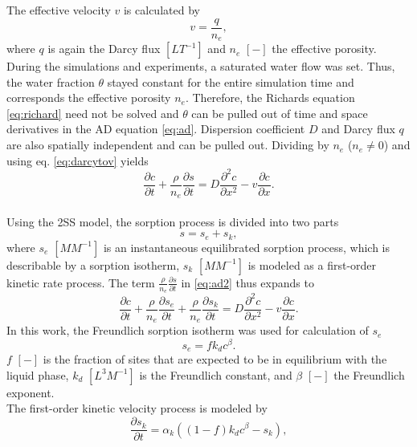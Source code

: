 The effective velocity $v$ is calculated by
\begin{equation}
    v = \frac{q}{n_e},
    \label{eq:darcytov}
\end{equation}
where $q$ is again the Darcy flux $[LT^{-1}]$ and $n_e$ $[-]$ the effective porosity.\\
During the simulations and experiments, a saturated water flow was set. Thus, the water fraction $\theta$ stayed constant for the entire simulation time and corresponds the effective porosity $n_e$. Therefore, the Richards equation \ref{eq:richard} need not be solved and $\theta$ can be pulled out of time and space derivatives in the AD equation \ref{eq:ad}. Dispersion coefficient $D$ and Darcy flux $q$ are also spatially independent and can be pulled out. Dividing by $n_e$ ($n_e \neq 0$) and using eq. \ref{eq:darcytov} yields
\begin{equation}
    \frac{\partial c}{\partial t} + \frac{\rho}{n_e} \frac{\partial s}{\partial t} = D \frac{\partial^2 c}{\partial x^2} - v\frac{\partial c}{\partial x}.
    \label{eq:ad2}
\end{equation}
\\
Using the 2SS model, the sorption process is divided into two parts
\begin{equation}
    s = s_e + s_k,
\end{equation}
where $s_e$ $[M M^{-1}]$ is an instantaneous equilibrated sorption process, which is describable by a sorption isotherm, $s_k$ $[M M^{-1}]$ is modeled as a first-order kinetic rate process. The term $\frac{\rho}{n_e} \frac{\partial s}{\partial t}$ in \ref{eq:ad2} thus expands to
\begin{equation}
        \frac{\partial c}{\partial t} + \frac{\rho}{n_e} \frac{\partial s_e}{\partial t} + \frac{\rho}{n_e} \frac{\partial s_k}{\partial t} = D \frac{\partial^2 c}{\partial x^2} - v\frac{\partial c}{\partial x}.
    \label{eq:ad2ss}
\end{equation}
In this work, the Freundlich sorption isotherm \cite{Freundlich1907Oct} was used for calculation of $s_e$
\begin{equation}
s_e = fk_dc^{\beta}
    \label{eq:freundlich}.
\end{equation}
$f$ $[-]$ is the fraction of sites that are expected to be in equilibrium with the liquid phase, $k_d$ $[L^3 M^{-1}]$ is the Freundlich constant, and $\beta$ $[-]$ the Freundlich exponent.\\
The first-order kinetic velocity process is modeled by
\begin{equation}
    \frac{\partial s_k}{\partial t} = \alpha_k ((1-f)k_dc^{\beta} - s_k),
    \label{eq:rate_process}
\end{equation}
